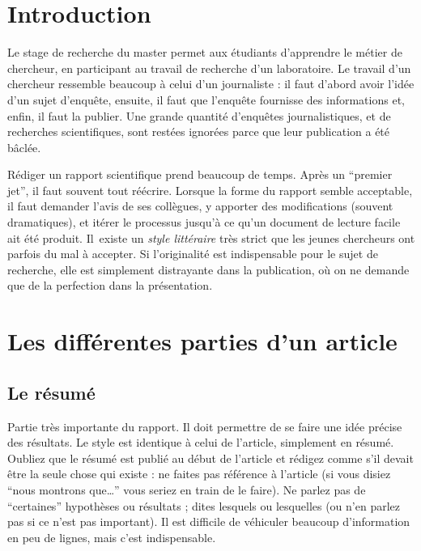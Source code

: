 \documentclass{ipgpmaster}
\begin{document}
\newpage
\tableofcontents
\newpage

\section{Introduction}

Le stage de recherche du master permet aux étudiants d'apprendre le métier 
de chercheur, en participant au travail de recherche d'un laboratoire. 
Le travail d'un chercheur ressemble beaucoup à celui d'un journaliste : 
il faut d'abord avoir l'idée d'un sujet d'enquête, ensuite, il faut que 
l'enquête fournisse des informations et, enfin, il faut la publier. 
Une grande quantité d'enquêtes journalistiques, et de recherches 
scientifiques, sont restées ignorées parce que leur publication a été 
bâclée.

Rédiger un rapport scientifique prend beaucoup de temps. Après un 
``premier jet'', il faut souvent tout réécrire. 
Lorsque la forme du rapport semble acceptable, il faut demander l'avis 
de ses collègues, y apporter des modifications (souvent dramatiques), 
et itérer le processus
jusqu'à ce qu'un document de lecture facile ait été produit. Il~existe 
un \emph{style littéraire\/} très strict que les jeunes chercheurs ont parfois 
du mal à accepter. Si l'originalité est indispensable pour le sujet de 
recherche, elle est simplement distrayante dans la publication,
où on ne demande que de la perfection dans la pré\-sen\-ta\-tion.


\section{Les différentes parties d'un article}


\subsection{Le résumé}

Partie très importante du rapport.
Il doit permettre de se faire une idée précise des résultats.
Le style est identique à celui de l'article, simplement en résumé.
Oubliez que le résumé est publié au début de l'article et rédigez 
comme s'il devait être la seule chose qui existe : ne faites pas 
référence à l'article (si vous disiez ``nous montrons que\dots'' 
vous seriez en train de le faire). 
Ne parlez pas de ``certaines'' hypothèses ou résultats ; dites lesquels 
ou lesquelles (ou n'en parlez pas si ce n'est pas important). Il est difficile de véhiculer beaucoup 
d'information en peu de lignes, mais c'est indispensable.
\end{document}
